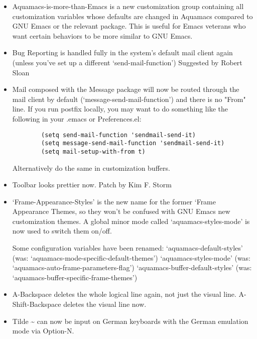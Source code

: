 \begin{itemize}
\item  Aquamacs-is-more-than-Emacs is a new customization group
        containing all customization variables whose defaults are changed
        in Aquamacs compared to GNU Emacs or the relevant package.
        This is useful for Emacs veterans who want certain behaviors to be
        more similar to GNU Emacs.

\item  Bug Reporting is handled fully in the system's default mail
        client again (unless you've set up a different
        `send-mail-function')
        Suggested by Robert Sloan

\item  Mail composed with the Message package will now be routed
        through the mail client by default (`message-send-mail-function')
        and there is no "From" line. If you run postfix locally, you may
        want to do something like the following in your .emacs or Preferences.el:

\begin{verbatim}
        (setq send-mail-function 'sendmail-send-it)
        (setq message-send-mail-function 'sendmail-send-it)
        (setq mail-setup-with-from t)
\end{verbatim}

        Alternatively do the same in customization buffers.

\item  Toolbar looks prettier now.
        Patch by Kim F. Storm

\item  `Frame-Appearance-Styles' is the new name for the former `Frame
        Appearance Themes, so they won't be confused with GNU Emacs new
        customization themes. A global minor mode called
        `aquamacs-styles-mode' is now used to switch them on/off.

        Some configuration variables have been renamed:
        `aquamacs-default-styles'
               (was: `aquamacs-mode-specific-default-themes')
        `aquamacs-styles-mode'
               (was: `aquamacs-auto-frame-parameters-flag')
        `aquamacs-buffer-default-styles'
               (was: `aquamacs-buffer-specific-frame-themes')

\item  A-Backspace deletes the whole logical line again, not just
        the visual line. A-Shift-Backspace deletes the visual line now.

\item  Tilde {\textasciitilde{}} can now be input on German keyboards with the German
        emulation mode via Option-N.


\end{itemize}
